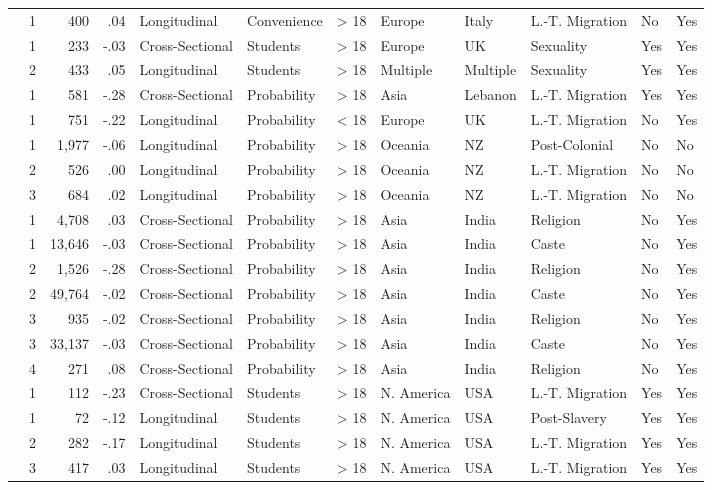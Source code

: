 \documentclass[10pt, letterpaper]{article}
\begin{document}
\begin{landscape}
\begin{xltabular}{650pt}{Xrrrllrlllll}
\cite{2391} & 1 & 400 & .04 & Longitudinal & Convenience & > 18 & Europe & Italy & L.-T. Migration & No & Yes\\
\cite{956} & 1 & 233 & -.03 & Cross-Sectional & Students & > 18 & Europe & UK & Sexuality & Yes & Yes\\
 & 2 & 433 & .05 & Longitudinal & Students & > 18 & Multiple & Multiple & Sexuality & Yes & Yes\\
\cite{1114} & 1 & 581 & -.28 & Cross-Sectional & Probability & > 18 & Asia & Lebanon & L.-T. Migration & Yes & Yes\\
\cite{2382} & 1 & 751 & -.22 & Longitudinal & Probability & < 18 & Europe & UK & L.-T. Migration & No & Yes\\
\cite{2381} & 1 & 1,977 & -.06 & Longitudinal & Probability & > 18 & Oceania & NZ & Post-Colonial & No & No\\
 & 2 & 526 & .00 & Longitudinal & Probability & > 18 & Oceania & NZ & L.-T. Migration & No & No\\
 & 3 & 684 & .02 & Longitudinal & Probability & > 18 & Oceania & NZ & L.-T. Migration & No & No\\
\cite{2385} & 1 & 4,708 & .03 & Cross-Sectional & Probability & > 18 & Asia & India & Religion & No & Yes\\
\cite{2392} & 1 & 13,646 & -.03 & Cross-Sectional & Probability & > 18 & Asia & India & Caste & No & Yes\\
 & 2 & 1,526 & -.28 & Cross-Sectional & Probability & > 18 & Asia & India & Religion & No & Yes\\
 & 2 & 49,764 & -.02 & Cross-Sectional & Probability & > 18 & Asia & India & Caste & No & Yes\\
 & 3 & 935 & -.02 & Cross-Sectional & Probability & > 18 & Asia & India & Religion & No & Yes\\
 & 3 & 33,137 & -.03 & Cross-Sectional & Probability & > 18 & Asia & India & Caste & No & Yes\\
 & 4 & 271 & .08 & Cross-Sectional & Probability & > 18 & Asia & India & Religion & No & Yes\\
\cite{2375} & 1 & 112 & -.23 & Cross-Sectional & Students & > 18 & N. America & USA & L.-T. Migration & Yes & Yes\\
\cite{1743} & 1 & 72 & -.12 & Longitudinal & Students & > 18 & N. America & USA & Post-Slavery & Yes & Yes\\
 & 2 & 282 & -.17 & Longitudinal & Students & > 18 & N. America & USA & L.-T. Migration & Yes & Yes\\
 & 3 & 417 & .03 & Longitudinal & Students & > 18 & N. America & USA & L.-T. Migration & Yes & Yes\\
 

\end{xltabular}
\end{landscape}
\end{document}
